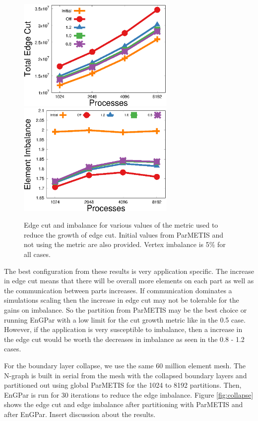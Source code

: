 \documentclass[conference]{IEEEtran}
\begin{document}
\begin{figure}[!ht]
  \centering
  \includegraphics[width=3in]{plots/aepw_edgeCut_collapse_results/ecut_v_cores}
  \includegraphics[width=3in]{plots/aepw_edgeCut_collapse_results/eimb_v_cores}
  \caption{Edge cut and imbalance for various values of the metric used to reduce the growth of edge cut. Initial values from ParMETIS and not using the metric are also provided. Vertex imbalance is 5\% for all cases.}
  \label{fig:metric}
\end{figure}

The best configuration from these results is very application specific. The increase in
edge cut means that there will be overall more elements on each part as well as the communication
between parts increases. If communication dominates a simulations scaling then the increase in
edge cut may not be tolerable for the gains on imbalance. So the partition from ParMETIS may
be the best choice or running EnGPar with a low limit for the cut growth metric like in the
0.5 case. However, if the application is very susceptible to imbalance, then a increase in the
edge cut would be worth the decreases in imbalance as seen in the 0.8 - 1.2 cases.

For the boundary layer collapse, we use the same 60 million element mesh. The N-graph is
built in serial from the mesh with the collapsed boundary layers and partitioned
out using global ParMETIS for the 1024 to 8192 partitions.
Then, EnGPar is run for 30 iterations to reduce the edge imbalance. Figure \ref{fig:collapse}
shows the edge cut and edge imbalance after partitioning with
ParMETIS and after EnGPar. {\color{red} Insert discussion about the results.}
\end{document}
